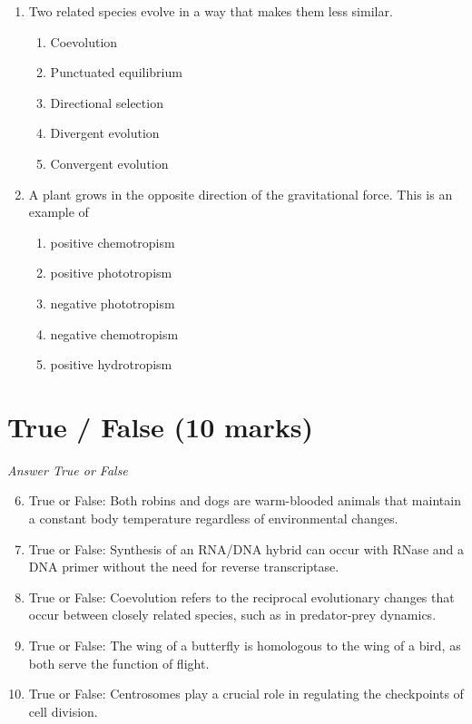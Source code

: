 \documentclass[12pt]{article}
\begin{document}
\begin{enumerate}[label=\arabic*.]
\begin{enumerate}[label=(\alph*)]
\end{enumerate}
\item Two related species evolve in a way that makes them less similar.
\begin{enumerate}[label=(\alph*)]
    \item Coevolution
    \item Punctuated equilibrium
    \item Directional selection
    \item Divergent evolution
    \item Convergent evolution
\end{enumerate}
\item A plant grows in the opposite direction of the gravitational force. This is an example of
\begin{enumerate}[label=(\alph*)]
    \item positive chemotropism
    \item positive phototropism
    \item negative phototropism
    \item negative chemotropism
    \item positive hydrotropism
\end{enumerate}
\end{enumerate}

\section*{True / False (10 marks)}
\textit{Answer True or False}
\begin{enumerate}[label=\arabic*.]
\setcounter{enumi}{5}
\item True or False: Both robins and dogs are warm-blooded animals that maintain a constant body temperature regardless of environmental changes.
\item True or False: Synthesis of an RNA/DNA hybrid can occur with RNase and a DNA primer without the need for reverse transcriptase.
\item True or False: Coevolution refers to the reciprocal evolutionary changes that occur between closely related species, such as in predator-prey dynamics.
\item True or False: The wing of a butterfly is homologous to the wing of a bird, as both serve the function of flight.
\item True or False: Centrosomes play a crucial role in regulating the checkpoints of cell division.
\end{enumerate}
\end{document}
